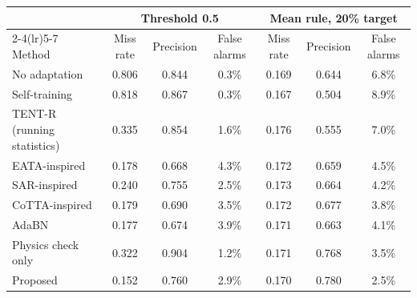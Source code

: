 \begin{tabular}{lcccccc}
\toprule
 & \multicolumn{3}{c}{Threshold 0.5} & \multicolumn{3}{c}{Mean rule, 20\% target} \\
\cmidrule(lr){2-4}\cmidrule(lr){5-7}
Method & Miss rate & Precision & False alarms & Miss rate & Precision & False alarms \\
\midrule
No adaptation & 0.806 & 0.844 & 0.3\% & 0.169 & 0.644 & 6.8\% \\
Self-training & 0.818 & 0.867 & 0.3\% & 0.167 & 0.504 & 8.9\% \\
TENT-R (running statistics) & 0.335 & 0.854 & 1.6\% & 0.176 & 0.555 & 7.0\% \\
EATA-inspired & 0.178 & 0.668 & 4.3\% & 0.172 & 0.659 & 4.5\% \\
SAR-inspired & 0.240 & 0.755 & 2.5\% & 0.173 & 0.664 & 4.2\% \\
CoTTA-inspired & 0.179 & 0.690 & 3.5\% & 0.172 & 0.677 & 3.8\% \\
AdaBN & 0.177 & 0.674 & 3.9\% & 0.171 & 0.663 & 4.1\% \\
Physics check only & 0.322 & 0.904 & 1.2\% & 0.171 & 0.768 & 3.5\% \\
Proposed & 0.152 & 0.760 & 2.9\% & 0.170 & 0.780 & 2.5\% \\
\bottomrule
\end{tabular}
